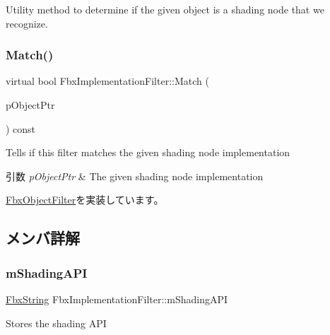 Utility method to determine if the given object is a shading node that we recognize. \mbox{\label{class_fbx_implementation_filter_a59ab32592ea71f1853f1cc5f641a341d}} 
\subsubsection{\texorpdfstring{Match()}{Match()}}
{\footnotesize\ttfamily virtual bool Fbx\+Implementation\+Filter\+::\+Match (\begin{DoxyParamCaption}\item[{const \hyperlink{class_fbx_object}{Fbx\+Object} $\ast$}]{p\+Object\+Ptr }\end{DoxyParamCaption}) const\hspace{0.3cm}{\ttfamily [virtual]}}

Tells if this filter matches the given shading node implementation 
\begin{DoxyParams}{引数}
{\em p\+Object\+Ptr} & The given shading node implementation \\
\hline
\end{DoxyParams}


\hyperlink{class_fbx_object_filter_a49cc7b7c109f98910241d62ec0bd093b}{Fbx\+Object\+Filter}を実装しています。



\subsection{メンバ詳解}
\mbox{\label{class_fbx_implementation_filter_afc2611e4f45d48ce02a04f98b7d84879}} 
\subsubsection{\texorpdfstring{m\+Shading\+A\+PI}{mShadingAPI}}
{\footnotesize\ttfamily \hyperlink{class_fbx_string}{Fbx\+String} Fbx\+Implementation\+Filter\+::m\+Shading\+A\+PI}



Stores the shading A\+PI 



